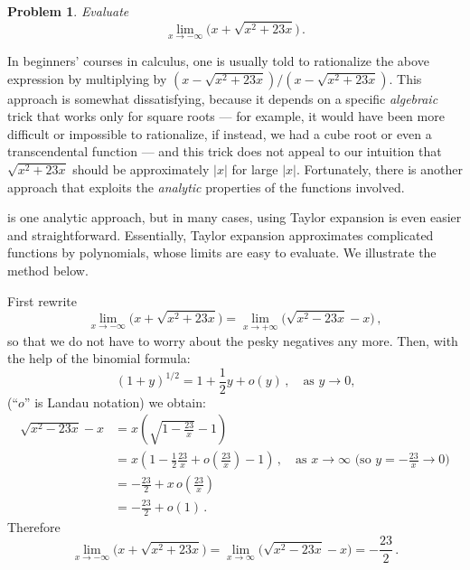 \documentclass[12pt]{article}
\providecommand{\abs}[1]{\lvert#1\rvert}
\newtheorem*{prob}{Problem}
\begin{document}

\begin{prob}
Evaluate
\[
\lim_{x \to -\infty} \bigl( x + \sqrt{x^2 + 23 x} \bigr)\,.
\]
\end{prob}

In beginners' courses in calculus, one is usually told to 
rationalize the above expression by multiplying by $
(x-\sqrt{x^2+ 23x})/(x-\sqrt{x^2+23 x})$.
This approach is somewhat dissatisfying, because it depends
on a specific \emph{algebraic} trick that works only for square roots
 --- for example, it would have been more difficult or impossible to rationalize, if instead, we had a cube root or even a transcendental function   ---
and this trick does not appeal to our intuition that
$\sqrt{x^2 + 23 x}$ should be approximately 
$\abs{x}$ for large $\abs{x}$.
Fortunately, there  is another approach that
exploits the \emph{analytic} properties of the functions involved.

 is one analytic approach, 
but in many cases, using Taylor expansion is even easier
and straightforward. Essentially, Taylor expansion approximates 
complicated functions by polynomials, whose limits are easy to evaluate.
We illustrate the method below.

First rewrite
\[
\lim_{x \to -\infty} \bigl(x+\sqrt{x^2 + 23 x} \bigr)
= \lim_{x \to +\infty} \bigl(\sqrt{x^2 - 23 x} - x \bigr) \,,
\]
so  that we do not have to worry about the pesky negatives any more.
Then, with the help of the binomial formula:
\[
(1+y)^{1/2} = 1 + \frac{1}{2} y + o(y)\,,\quad \textrm{as $y \to 0$,}
\]
(``$o$'' is Landau notation)
we obtain:
\begin{align*}
\sqrt{x^2 - 23 x} - x  
&= x \left( \sqrt{1 - \frac{23}{x}} - 1 \right) \\
&= x \left( 1 - \frac{1}{2} \frac{23}{x} + o\left(\frac{23}{x}\right) - 1 \right)\,,
\quad \textrm{as $x \to \infty$ (so $y = -\frac{23}{x} \to 0$)}\\
&= -\frac{23}{2} + x \, o\left(\frac{23}{x}\right) \\
&= -\frac{23}{2} + o(1)\,.
\end{align*}
Therefore
\[
\lim_{x \to -\infty} \bigl( x + \sqrt{x^2 + 23 x} \bigr) = \lim_{x\to\infty} \bigl( \sqrt{x^2 - 23 x} - x\bigr) = -\frac{23}{2}\,.
\]
\end{document}
